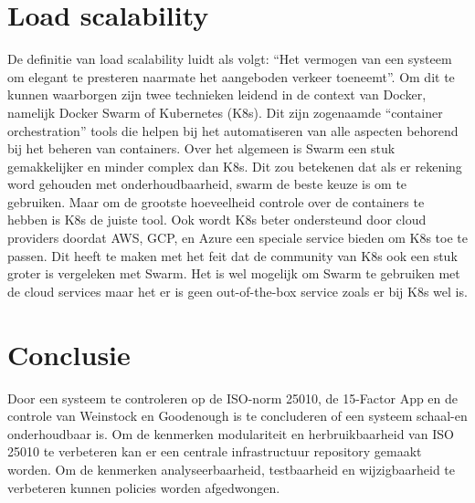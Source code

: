 \section{Load scalability}

De definitie van load scalability luidt als volgt: \enquote{Het vermogen van een systeem om elegant te presteren naarmate het aangeboden verkeer toeneemt}. Om dit te kunnen waarborgen zijn twee technieken leidend in de context van Docker, namelijk Docker Swarm of Kubernetes (K8s). Dit zijn zogenaamde \enquote{container orchestration} tools die helpen bij het automatiseren van alle aspecten behorend bij het beheren van containers. Over het algemeen is Swarm een stuk gemakkelijker en minder complex dan K8s. Dit zou betekenen dat als er rekening word gehouden met onderhoudbaarheid, swarm de beste keuze is om te gebruiken. Maar om de grootste hoeveelheid controle over de containers te hebben is K8s de juiste tool. Ook wordt K8s beter ondersteund door cloud providers doordat AWS, GCP, en Azure een speciale service bieden om K8s toe te passen. Dit heeft te maken met het feit dat de community van K8s ook een stuk groter is vergeleken met Swarm. Het is wel mogelijk om Swarm te gebruiken met de cloud services maar het er is geen out-of-the-box service zoals er bij K8s wel is.
 
\section{Conclusie}

Door een systeem te controleren op de ISO-norm 25010, de 15-Factor App en de controle van Weinstock en Goodenough is te concluderen of een systeem schaal-en onderhoudbaar is. Om de kenmerken modulariteit en herbruikbaarheid van ISO 25010 te verbeteren kan er een centrale infrastructuur repository gemaakt worden. Om de kenmerken analyseerbaarheid, testbaarheid en wijzigbaarheid te verbeteren kunnen policies worden afgedwongen.